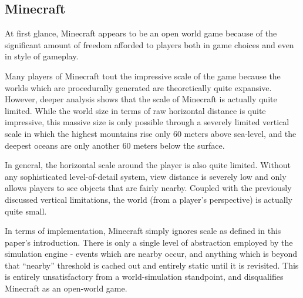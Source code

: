 \subsection{Minecraft}

At first glance, Minecraft appears to be an open world game because of the significant amount of freedom afforded to players both in game choices and even in style of gameplay.

Many players of Minecraft tout the impressive scale of the game because the worlds which are procedurally generated are theoretically quite expansive. However, deeper analysis shows that the scale of Minecraft is actually quite limited. While the world size in terms of raw horizontal distance is quite impressive, this massive size is only possible through a severely limited vertical scale in which the highest mountains rise only 60 meters above sea-level, and the deepest oceans are only another 60 meters below the surface.

In general, the horizontal scale around the player is also quite limited. Without any sophisticated level-of-detail system, view distance is severely low
and only allows players to see objects that are fairly nearby. Coupled with the previously discussed vertical limitations, the world (from a player's perspective) is actually quite small.

In terms of implementation, Minecraft simply ignores scale as defined in this paper's introduction. There is only a single level of abstraction employed by
the simulation engine - events which are nearby occur, and anything which is beyond that ``nearby'' threshold is cached out and entirely static until it is
revisited. This is entirely unsatisfactory from a world-simulation standpoint, and disqualifies Minecraft as an open-world game.
